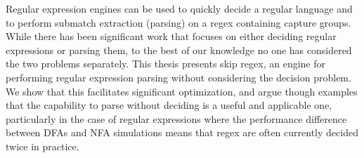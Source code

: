 \begin{thesisabstract}

Regular expression engines can be used to quickly decide a
regular language and to perform submatch extraction (parsing)
on a regex containing capture groups. While there
has been significant work that focuses on either
deciding regular expressions or parsing them, to
the best of our knowledge no one has considered the
two problems separately. This thesis presents skip
regex, an engine for performing regular expression
parsing without considering the decision problem.
We show that this facilitates significant optimization,
and argue though examples that the capability to parse
without deciding is a useful and applicable one, particularly
in the case of regular expressions where the performance
difference between DFAs and NFA simulations means that regex are
often currently decided twice in practice.


\nopagebreak
\end{thesisabstract}
